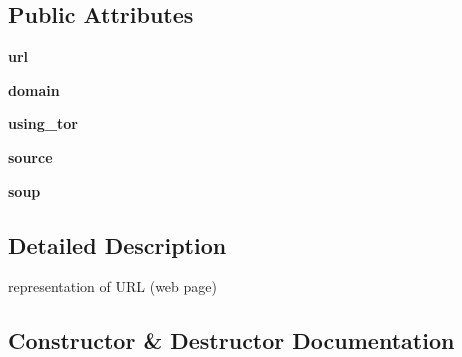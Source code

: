 \subsection*{Public Attributes}
\begin{DoxyCompactItemize}
\item 
{\bfseries url}\hypertarget{classhal_1_1internet_1_1web_1_1_webpage_a9daf360debee3008329bcd28c0e578ed}{}\label{classhal_1_1internet_1_1web_1_1_webpage_a9daf360debee3008329bcd28c0e578ed}

\item 
{\bfseries domain}\hypertarget{classhal_1_1internet_1_1web_1_1_webpage_a0440d1bfe5d1a8e510d8ac3254731846}{}\label{classhal_1_1internet_1_1web_1_1_webpage_a0440d1bfe5d1a8e510d8ac3254731846}

\item 
{\bfseries using\+\_\+tor}\hypertarget{classhal_1_1internet_1_1web_1_1_webpage_a7320808ec3b5ad1a2b8f30dd10d50229}{}\label{classhal_1_1internet_1_1web_1_1_webpage_a7320808ec3b5ad1a2b8f30dd10d50229}

\item 
{\bfseries source}\hypertarget{classhal_1_1internet_1_1web_1_1_webpage_ae44cb4f2581c38185f08f1f9be1c7f1f}{}\label{classhal_1_1internet_1_1web_1_1_webpage_ae44cb4f2581c38185f08f1f9be1c7f1f}

\item 
{\bfseries soup}\hypertarget{classhal_1_1internet_1_1web_1_1_webpage_a03808ba06bc15af222b922960cf2232a}{}\label{classhal_1_1internet_1_1web_1_1_webpage_a03808ba06bc15af222b922960cf2232a}

\end{DoxyCompactItemize}


\subsection{Detailed Description}
\begin{DoxyVerb}representation of URL (web page)\end{DoxyVerb}
 

\subsection{Constructor \& Destructor Documentation}

